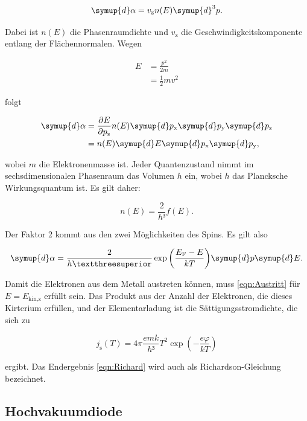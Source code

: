 \begin{equation*}
\symup{d}\alpha = v_\text{z} n(E) \symup{d}^3p.
\end{equation*}

Dabei ist $n(E)$ die Phasenraumdichte und $v_\text{z}$ die Geschwindigkeitskomponente
entlang der Flächennormalen. Wegen

\begin{align*}
E &= \frac{p^2}{2m}\\
&= \frac{1}{2}mv^2
\end{align*}

folgt

\begin{align*}
\symup{d}\alpha &= \frac{\partial E}{\partial p_\text{z}} n(E) \symup{d}p_\text{x} \symup{d}p_\text{y} \symup{d}p_\text{z}\\
&=n(E) \symup{d}E\symup{d}p_\text{x}\symup{d}p_\text{y},
\end{align*}

wobei $m$ die Elektronenmasse ist. Jeder Quantenzustand nimmt im sechsdimensionalen 
Phasenraum das Volumen $h$ ein, wobei $h$ das Plancksche Wirkungsquantum ist. Es 
gilt daher: 

\begin{equation*}
n(E) = \frac{2}{h³}f(E).
\end{equation*}

Der Faktor 2 kommt aus den zwei Möglichkeiten des Spins. Es gilt also 

\begin{equation*}
\symup{d}\alpha = \frac{2}{h³} \exp{\left(\frac{E_\text{F}-E}{kT}\right)}\symup{d}p\symup{d}E.
\end{equation*}

Damit die Elektronen aus dem Metall austreten können, muss \eqref{eqn:Austritt}
für $E=E_\text{kin,z}$ erfüllt sein. Das Produkt aus der Anzahl der Elektronen, 
die dieses Kirterium erfüllen, und der Elementarladung ist die Sättigungsstromdichte,
die sich zu 

\begin{equation}
j_\text{s}(T) = 4\pi\frac{emk}{h³}T^2 \exp{\left(-\frac{e\varphi}{kT}\right)}
\label{eqn:Richard}
\end{equation}

ergibt. Das Endergebnis \eqref{eqn:Richard} wird auch als Richardson-Gleichung
bezeichnet. 

\subsection{Hochvakuumdiode}

